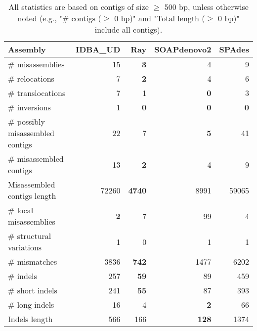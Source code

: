\documentclass[12pt,a4paper]{article}
\begin{document}
\begin{table}[ht]
\begin{center}
\caption{All statistics are based on contigs of size $\geq$ 500 bp, unless otherwise noted (e.g., "\# contigs ($\geq$ 0 bp)" and "Total length ($\geq$ 0 bp)" include all contigs).}
\begin{tabular}{|l*{4}{|r}|}
\hline
Assembly & IDBA\_UD & Ray & SOAPdenovo2 & SPAdes \\ \hline
\# misassemblies & 15 & {\bf 3} & 4 & 9 \\ \hline
\hspace{5mm}\# relocations & 7 & {\bf 2} & 4 & 6 \\ \hline
\hspace{5mm}\# translocations & 7 & 1 & {\bf 0} & 3 \\ \hline
\hspace{5mm}\# inversions & 1 & {\bf 0} & {\bf 0} & {\bf 0} \\ \hline
\# possibly misassembled contigs & 22 & 7 & {\bf 5} & 41 \\ \hline
\# misassembled contigs & 13 & {\bf 2} & 4 & 9 \\ \hline
Misassembled contigs length & 72260 & {\bf 4740} & 8991 & 59065 \\ \hline
\# local misassemblies & {\bf 2} & 7 & 99 & 4 \\ \hline
\# structural variations & 1 & 0 & 1 & 1 \\ \hline
\# mismatches & 3836 & {\bf 742} & 1477 & 6202 \\ \hline
\# indels & 257 & {\bf 59} & 89 & 459 \\ \hline
\hspace{5mm}\# short indels & 241 & {\bf 55} & 87 & 393 \\ \hline
\hspace{5mm}\# long indels & 16 & 4 & {\bf 2} & 66 \\ \hline
Indels length & 566 & 166 & {\bf 128} & 1374 \\ \hline
\end{tabular}
\end{center}
\end{table}
\end{document}
